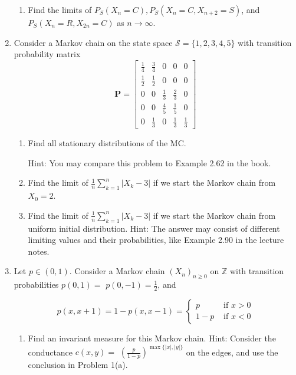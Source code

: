 \documentclass{article} %
\theoremstyle{plain}
\theoremstyle{case}
\begin{document}
\begin{enumerate}[label={\fbox{\textbf{Exercise \#\arabic* :}}}]
\begin{enumerate}
    \item  Find the limits of $P_{S}\left(X_{n}=C\right), P_{S}\left(X_{n}=C, X_{n+2}=S\right)$, and $P_{S}\left(X_{n}=R, X_{2 n}=C\right)$ as $n \rightarrow \infty$.
  \end{enumerate}
\newpage
  \item Consider a Markov chain on the state space $\mathcal{S}=\{1,2,3,4,5\}$ with transition probability matrix
$$
\mathbf{P}=\left[\begin{array}{ccccc}
\frac{1}{4} & \frac{3}{4} & 0 & 0 & 0 \\
\frac{1}{2} & \frac{1}{2} & 0 & 0 & 0 \\
0 & 0 & \frac{1}{3} & \frac{2}{3} & 0 \\
0 & 0 & \frac{4}{5} & \frac{1}{5} & 0 \\
0 & \frac{1}{3} & 0 & \frac{1}{3} & \frac{1}{3}
\end{array}\right]
$$

  \begin{enumerate}
    \item  Find all stationary distributions of the MC.

      Hint: You may compare this problem to Example 2.62 in the book.

    \item  Find the limit of $\frac{1}{n} \sum_{k=1}^{n}\left|X_{k}-3\right|$ if we start the Markov chain from $X_{0}=2$.

    \item  Find the limit of $\frac{1}{n} \sum_{k=1}^{n}\left|X_{k}-3\right|$ if we start the Markov chain from uniform initial distribution. Hint: The answer may consist of different limiting values and their probabilities, like Example 2.90 in the lecture notes.

  \end{enumerate}

\newpage
  \item Let $p \in(0,1)$. Consider a Markov chain $\left(X_{n}\right)_{n \geq 0}$ on $\mathbb{Z}$ with transition probabilities $p(0,1)=$ $p(0,-1)=\frac{1}{2}$, and

    \[
      p(x, x+1)=1-p(x, x-1)= \begin{cases}p & \text { if } x>0 \\ 1-p & \text { if } x<0\end{cases}
  \]
  \begin{enumerate}
    \item  Find an invariant measure for this Markov chain. Hint: Consider the conductance $c(x, y)=$ $\left(\frac{p}{1-p}\right)^{\max \{|x|,|y|\}}$ on the edges, and use the conclusion in Problem 1(a).


\end{enumerate}
\end{enumerate}
\end{document}
